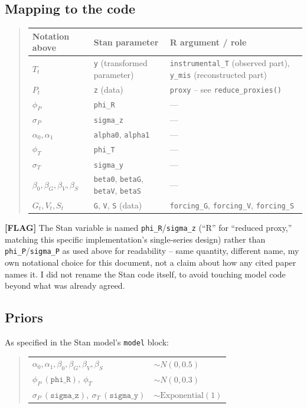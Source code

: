 \documentclass[10pt]{article}
\newcommand{\flag}[1]{\textcolor{gaporange}{\textbf{[FLAG]} #1}}
\newcommand{\rdsub}[1]{\subsection*{#1}}
\begin{document}
\rdsub{Mapping to the code}
\begin{quote}
\begin{tabular}{@{}lll@{}}
\textbf{Notation above} & \textbf{Stan parameter} & \textbf{R argument / role} \\
\hline
$T_t$ & \texttt{y} (transformed parameter) & \texttt{instrumental\_T} (observed part), \texttt{y\_mis} (reconstructed part) \\
$P_t$ & \texttt{z} (data) & \texttt{proxy} -- see \texttt{reduce\_proxies()} \\
$\phi_P$ & \texttt{phi\_R} & --- \\
$\sigma_P$ & \texttt{sigma\_z} & --- \\
$\alpha_0, \alpha_1$ & \texttt{alpha0}, \texttt{alpha1} & --- \\
$\phi_T$ & \texttt{phi\_T} & --- \\
$\sigma_T$ & \texttt{sigma\_y} & --- \\
$\beta_0,\beta_G,\beta_V,\beta_S$ & \texttt{beta0}, \texttt{betaG}, \texttt{betaV}, \texttt{betaS} & --- \\
$G_t, V_t, S_t$ & \texttt{G}, \texttt{V}, \texttt{S} (data) & \texttt{forcing\_G}, \texttt{forcing\_V}, \texttt{forcing\_S} \\
\end{tabular}
\end{quote}
\flag{The Stan variable is named \texttt{phi\_R}/\texttt{sigma\_z} (``R'' for
``reduced proxy,'' matching this specific implementation's single-series
design) rather than \texttt{phi\_P}/\texttt{sigma\_P} as used above for
readability -- same quantity, different name, my own notational choice for
this document, not a claim about how any cited paper names it. I did not
rename the Stan code itself, to avoid touching model code beyond what was
already agreed.}

\rdsub{Priors}
As specified in the Stan model's \texttt{model} block:
\begin{quote}
\begin{tabular}{@{}ll@{}}
$\alpha_0, \alpha_1, \beta_0, \beta_G, \beta_V, \beta_S$ & $\sim N(0, 0.5)$ \\
$\phi_P\ (\texttt{phi\_R}),\ \phi_T$ & $\sim N(0, 0.3)$ \\
$\sigma_P\ (\texttt{sigma\_z}),\ \sigma_T\ (\texttt{sigma\_y})$ & $\sim \text{Exponential}(1)$ \\
\end{tabular}
\end{quote}
\end{document}
